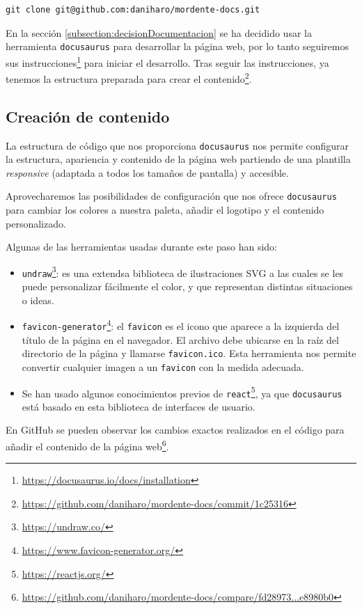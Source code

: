\begin{verbatim}
git clone git@github.com:daniharo/mordente-docs.git
\end{verbatim}

En la sección \ref{subsection:decisionDocumentacion} se ha decidido usar la herramienta \texttt{docusaurus} para desarrollar la página web, por lo tanto seguiremos sus instrucciones\footnote{\url{https://docusaurus.io/docs/installation}} para iniciar el desarrollo. Tras seguir las instrucciones, ya tenemos la estructura preparada para crear el contenido\footnote{\url{https://github.com/daniharo/mordente-docs/commit/1c25316}}.

\subsection{Creación de contenido}

La estructura de código que nos proporciona \texttt{docusaurus} nos permite configurar la estructura, apariencia y contenido de la página web partiendo de una plantilla \textit{responsive} (adaptada a todos los tamaños de pantalla) y accesible.

Aprovecharemos las posibilidades de configuración que nos ofrece \texttt{docusaurus} para cambiar los colores a nuestra paleta, añadir el logotipo y el contenido personalizado.

Algunas de las herramientas usadas durante este paso han sido:
\begin{itemize}
    \item \texttt{undraw}\footnote{\url{https://undraw.co/}}: es una extendsa biblioteca de ilustraciones SVG a las cuales se les puede personalizar fácilmente el color, y que representan distintas situaciones o ideas.
    \item \texttt{favicon-generator}\footnote{\url{https://www.favicon-generator.org/}}: el \texttt{favicon} es el icono que aparece a la izquierda del título de la página en el navegador. El archivo debe ubicarse en la raíz del directorio de la página y llamarse \texttt{favicon.ico}. Esta herramienta nos permite convertir cualquier imagen a un \texttt{favicon} con la medida adecuada.
    \item Se han usado algunos conocimientos previos de \texttt{react}\footnote{\url{https://reactjs.org/}}, ya que \texttt{docusaurus} está basado en esta biblioteca de interfaces de usuario.
\end{itemize}

En GitHub se pueden observar los cambios exactos realizados en el código para añadir el contenido de la página web\footnote{\url{https://github.com/daniharo/mordente-docs/compare/fd28973...e8980b0}}.



